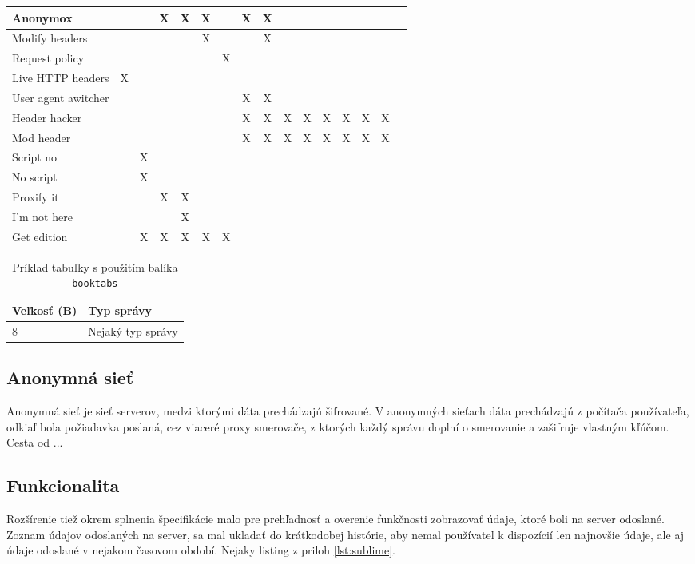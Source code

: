 \begin{table}[ht]
\begin{center}
\begin{tabular}{p{4cm}|c|c|c|c|c|c|c|c|c|c|c|c|c|c|c}
Anonymox &  && X & X & X &  & X & X & & & & & & \\  \hline
Modify headers & & &  &  & X &  &  & X &  &  &  & & &  \\  \hline
Request policy & & &  &  & & X  &  &  &  &  &  & & &   \\  \hline
Live HTTP headers & X& &  &  & &  &  &  &  &  &  & & &   \\  \hline
User agent awitcher & & &  &  & &  & X & X &  &  &  & & &   \\  \hline
Header hacker & & &  &  & &  & X & X & X & X & X & X & X & X    \\  \hline
Mod header & & &  &  & &  & X & X & X & X & X & X & X & X    \\  \hline
Script no & &X &  &  & &  &  &  &  &  &  &  &  &     \\  \hline
No script & &X &  &  & &  &  &  &  &  &  &  &  &     \\  \hline
Proxify it & & &X  & X & &  &  &  &  &  &  &  &  &     \\  \hline
I'm not here & & &  & X & &  &  &  &  &  &  &  &  &     \\  \hline
Get edition & &X &X &X &X&X &  &  &  &  &  &  &  &     \\  \hline
\end{tabular}
\end{center}
\end{table}

\begin{table}[ht]
    \centering
    \caption{Príklad tabuľky s použitím balíka \texttt{booktabs}}
    \begin{tabular}{@{}ll@{}} \toprule
         Veľkosť (B) & Typ správy \\ \midrule
         8 & Nejaký typ správy \\ \bottomrule
    \end{tabular}
    \label{tab:my_label}
\end{table}

\subsection{Anonymná sieť}
\noindent Anonymná sieť je sieť serverov, medzi ktorými dáta prechádzajú šifrované. V anonymných sieťach dáta prechádzajú z počítača používateľa, odkiaľ bola požiadavka poslaná, cez viaceré proxy smerovače, z ktorých každý správu doplní o smerovanie a zašifruje vlastným kľúčom. Cesta od ...


\subsection{Funkcionalita}
\noindent  Rozšírenie tiež okrem splnenia špecifikácie malo pre prehľadnosť a overenie funkčnosti zobrazovať údaje, ktoré boli na server odoslané. Zoznam údajov odoslaných na server, sa mal ukladať do krátkodobej histórie, aby nemal používateľ k dispozícií len najnovšie údaje, ale aj údaje odoslané v nejakom časovom období. Nejaky listing z priloh \ref{lst:sublime}.

